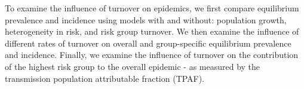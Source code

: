 To examine the influence of turnover on epidemics, we first
compare equilibrium prevalence and incidence using models with and without:
population growth,
heterogeneity in risk, and
risk group turnover.
We then examine the influence of different rates of turnover on
overall and group-specific equilibrium prevalence and incidence.
Finally, we examine the influence of turnover on the contribution of the 
highest risk group to the overall epidemic - as measured by the 
transmission population attributable fraction (TPAF).

